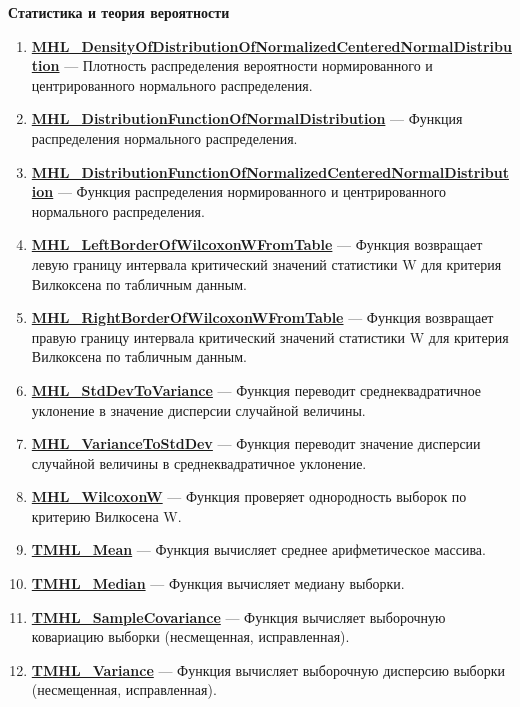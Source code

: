 \documentclass[a4paper,12pt]{article}
\begin{document}
\textbf{Статистика и теория вероятности}
\begin{enumerate}

\item \textbf{\hyperref[MHL_DensityOfDistributionOfNormalizedCenteredNormalDistribution]{MHL\_DensityOfDistributionOfNormalizedCenteredNormalDistribution}} --- Плотность распределения вероятности нормированного и центрированного нормального распределения.

\item \textbf{\hyperref[MHL_DistributionFunctionOfNormalDistribution]{MHL\_DistributionFunctionOfNormalDistribution}} --- Функция распределения нормального распределения.

\item \textbf{\hyperref[MHL_DistributionFunctionOfNormalizedCenteredNormalDistribution]{MHL\_DistributionFunctionOfNormalizedCenteredNormalDistribution}} --- Функция распределения нормированного и центрированного нормального распределения.

\item \textbf{\hyperref[MHL_LeftBorderOfWilcoxonWFromTable]{MHL\_LeftBorderOfWilcoxonWFromTable}} --- Функция возвращает левую границу интервала критический значений статистики W для критерия Вилкоксена по табличным данным.

\item \textbf{\hyperref[MHL_RightBorderOfWilcoxonWFromTable]{MHL\_RightBorderOfWilcoxonWFromTable}} --- Функция возвращает правую границу интервала критический значений статистики W для критерия Вилкоксена по табличным данным.

\item \textbf{\hyperref[MHL_StdDevToVariance]{MHL\_StdDevToVariance}} --- Функция переводит среднеквадратичное уклонение в значение дисперсии случайной величины.

\item \textbf{\hyperref[MHL_VarianceToStdDev]{MHL\_VarianceToStdDev}} --- Функция переводит значение дисперсии случайной величины в среднеквадратичное уклонение.

\item \textbf{\hyperref[MHL_WilcoxonW]{MHL\_WilcoxonW}} --- Функция проверяет однородность выборок по критерию Вилкосена W.

\item \textbf{\hyperref[TMHL_Mean]{TMHL\_Mean}} --- Функция вычисляет среднее арифметическое массива.

\item \textbf{\hyperref[TMHL_Median]{TMHL\_Median}} --- Функция вычисляет медиану выборки.

\item \textbf{\hyperref[TMHL_SampleCovariance]{TMHL\_SampleCovariance}} --- Функция вычисляет выборочную ковариацию выборки (несмещенная, исправленная).

\item \textbf{\hyperref[TMHL_Variance]{TMHL\_Variance}} --- Функция вычисляет выборочную дисперсию выборки (несмещенная, исправленная).

\end{enumerate}
\end{document}
